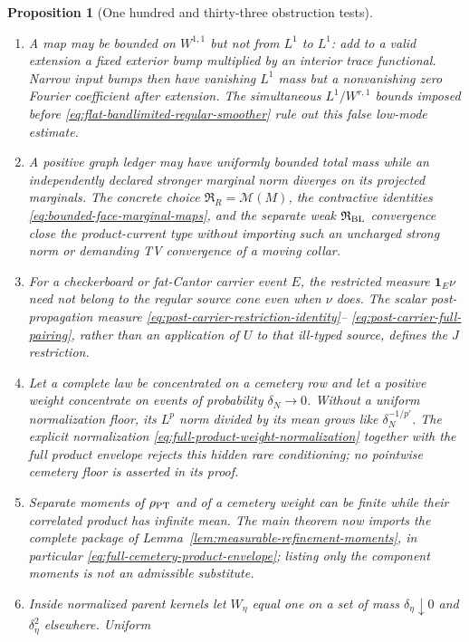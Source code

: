 \documentclass[11pt]{article}
\newtheorem{proposition}[theorem]{Proposition}
\newcommand{\one}{\mathbf 1}
\begin{document}
\begin{proposition}[One hundred and thirty-three obstruction tests]
\begin{enumerate}[label=\textup{(T\arabic*)}]
      cost.
\item A map may be bounded on $W^{1,1}$ but not from $L^1$ to $L^1$: add to a
      valid extension a fixed exterior bump multiplied by an interior trace
      functional.  Narrow input bumps then have vanishing $L^1$ mass but a
      nonvanishing zero Fourier coefficient after extension.  The simultaneous
      $L^1/W^{r,1}$ bounds imposed before
      \eqref{eq:flat-bandlimited-regular-smoother} rule out this false low-mode
      estimate.
\item A positive graph ledger may have uniformly bounded total mass while an
      independently declared stronger marginal norm diverges on its projected
      marginals.  The concrete choice
      $\mathfrak R_R=\mathcal M(M)$, the contractive identities
      \eqref{eq:bounded-face-marginal-maps}, and the separate weak
      $\mathfrak R_{\rm BL}$ convergence close the product-current type
      without importing such an uncharged strong norm or demanding TV
      convergence of a moving collar.
\item For a checkerboard or fat-Cantor carrier event $E$, the restricted
      measure $\one_E\nu$ need not belong to the regular source cone even
      when $\nu$ does.  The scalar post-propagation measure
      \eqref{eq:post-carrier-restriction-identity}--
      \eqref{eq:post-carrier-full-pairing}, rather than an application of
      $U$ to that ill-typed source, defines the $J$ restriction.
\item Let a complete law be concentrated on a cemetery row and let a
      positive weight concentrate on events of probability $\delta_N\to0$.
      Without a uniform normalization floor, its $L^p$ norm divided by its
      mean grows like $\delta_N^{-1/p'}$.  The explicit normalization
      \eqref{eq:full-product-weight-normalization} together with the full
      product envelope rejects this hidden rare conditioning; no pointwise
      cemetery floor is asserted in its proof.
\item Separate moments of $\rho_{\rm PT}$ and of a cemetery weight can be
      finite while their correlated product has infinite mean.  The main
      theorem now imports the complete package of
      Lemma~\ref{lem:measurable-refinement-moments}, in particular
      \eqref{eq:full-cemetery-product-envelope}; listing only the component
      moments is not an admissible substitute.
\item Inside normalized parent kernels let $W_\eta$ equal one on a set of
      mass $\delta_\eta\downarrow0$ and $\delta_\eta^2$ elsewhere.  Uniform

\end{enumerate}
\end{proposition}
\end{document}
